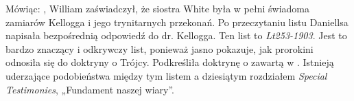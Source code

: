 Mówiąc: , William zaświadczył, że siostra White była w pełni świadoma zamiarów Kellogga i jego trynitarnych przekonań. Po przeczytaniu listu Daniellsa napisała bezpośrednią odpowiedź do dr. Kellogga. Ten list to \textit{Lt253-1903}. Jest to bardzo znaczący i odkrywczy list, ponieważ jasno pokazuje, jak prorokini odnosiła się do doktryny o Trójcy. Podkreśliła doktrynę o  zawartą w . Istnieją uderzające podobieństwa między tym listem a dziesiątym rozdziałem \textit{Special Testimonies}, „Fundament naszej wiary”.


